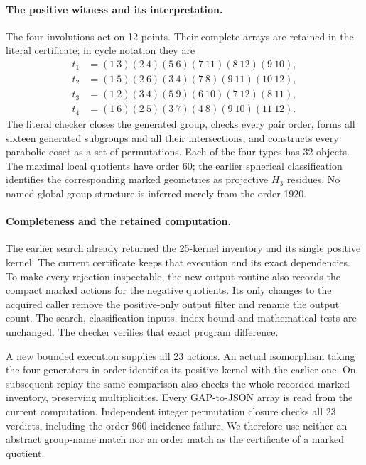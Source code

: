 \documentclass[11pt]{article}
\begin{document}
\paragraph{The positive witness and its interpretation.}
The four involutions act on 12 points. Their complete arrays are retained
in the literal certificate; in cycle notation they are
\[
\begin{aligned}
t_1&=(1\ 3)(2\ 4)(5\ 6)(7\ 11)(8\ 12)(9\ 10),\\
t_2&=(1\ 5)(2\ 6)(3\ 4)(7\ 8)(9\ 11)(10\ 12),\\
t_3&=(1\ 2)(3\ 4)(5\ 9)(6\ 10)(7\ 12)(8\ 11),\\
t_4&=(1\ 6)(2\ 5)(3\ 7)(4\ 8)(9\ 10)(11\ 12).
\end{aligned}
\]
The literal checker closes the generated group, checks every pair order,
forms all sixteen generated subgroups and all their intersections, and
constructs every parabolic coset as a set of permutations. Each of the
four types has 32 objects. The maximal local quotients have order 60;
the earlier spherical classification identifies the corresponding
marked geometries as projective $H_3$ residues. No named global group
structure is inferred merely from the order 1920.

\paragraph{Completeness and the retained computation.}
The earlier search already returned the 25-kernel inventory and its
single positive kernel. The current certificate keeps that execution
and its exact dependencies. To make every rejection inspectable, the
new output routine also records the compact marked actions for the
negative quotients. Its only changes to the acquired caller remove the
positive-only output filter and rename the output count. The search,
classification inputs, index bound and mathematical tests are unchanged.
The checker verifies that exact program difference.

A new bounded execution supplies all 23 actions. An actual isomorphism
taking the four generators in order identifies its positive kernel with
the earlier one. On subsequent replay the same comparison also checks
the whole recorded marked inventory, preserving multiplicities.
Every GAP-to-JSON array is read from the current computation. Independent
integer permutation closure checks all 23 verdicts, including the
order-960 incidence failure. We therefore use neither an abstract
group-name match nor an order match as the certificate of a marked
quotient.
\end{document}
